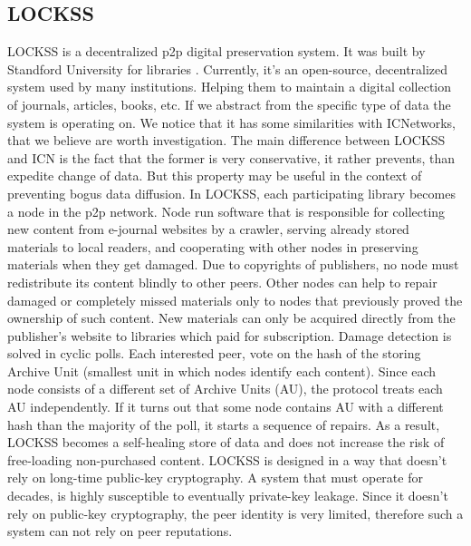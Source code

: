 \documentclass[nostrict]{szablonPG}
\begin{document}
\subsection{LOCKSS}
LOCKSS is a decentralized p2p digital preservation system. It was built by Standford University for libraries \cite{maniatis2003preserving}. Currently, it's an open-source, decentralized system used by many institutions. Helping them to maintain a digital collection of journals, articles, books, etc. If we abstract from the specific type of data the system is operating on. We notice that it has some similarities with ICNetworks, that we believe are worth investigation. The main difference between LOCKSS and ICN is the fact that the former is very conservative, it rather prevents, than expedite change of data. But this property may be useful in the context of preventing bogus data diffusion. 
In LOCKSS, each participating library becomes a node in the p2p network. Node run software that is responsible for collecting new content from e-journal websites by a crawler, serving already stored materials to local readers, and cooperating with other nodes in preserving materials when they get damaged. 
Due to copyrights of publishers, no node must redistribute its content blindly to other peers. Other nodes can help to repair damaged or completely missed materials only to nodes that previously proved the ownership of such content. New materials can only be acquired directly from the publisher's website to libraries which paid for subscription. 
Damage detection is solved in cyclic polls. Each interested peer, vote on the hash of the storing Archive Unit (smallest unit in which nodes identify each content). Since each node consists of a different set of Archive Units (AU), the protocol treats each AU independently. If it turns out that some node contains AU with a different hash than the majority of the poll, it starts a sequence of repairs. As a result, LOCKSS becomes a self-healing store of data and does not increase the risk of free-loading non-purchased content.
LOCKSS is designed in a way that doesn't rely on long-time public-key cryptography. A system that must operate for decades, is highly susceptible to eventually private-key leakage. Since it doesn't rely on public-key cryptography, the peer identity is very limited, therefore such a system can not rely on peer reputations.
\end{document}

